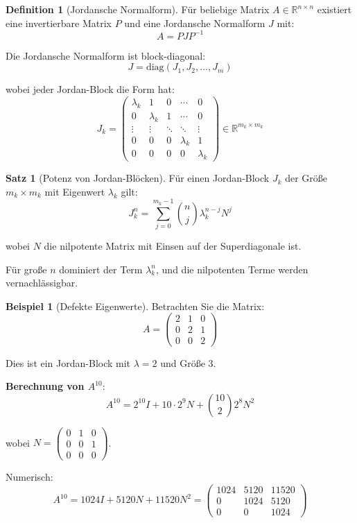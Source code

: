 ﻿\documentclass[a4paper,12pt]{report}
\theoremstyle{definition}
\newtheorem{definition}{Definition}
\newtheorem{beispiel}{Beispiel}
\newtheorem{satz}{Satz}
\begin{document}
	\begin{definition}[Jordansche Normalform]
		Für beliebige Matrix $A \in \mathbb{R}^{n \times n}$ existiert eine invertierbare Matrix $P$ und eine Jordansche Normalform $J$ mit:
		\[
		A = P J P^{-1}
		\]
		
		Die Jordansche Normalform ist block-diagonal:
		\[
		J = \text{diag}(J_1, J_2, \ldots, J_m)
		\]
		
		wobei jeder Jordan-Block die Form hat:
		\[
		J_k = \begin{pmatrix}
			\lambda_k & 1 & 0 & \cdots & 0 \\
			0 & \lambda_k & 1 & \cdots & 0 \\
			\vdots & \vdots & \ddots & \ddots & \vdots \\
			0 & 0 & 0 & \lambda_k & 1 \\
			0 & 0 & 0 & 0 & \lambda_k
		\end{pmatrix} \in \mathbb{R}^{m_k \times m_k}
		\]
	\end{definition}
	
	\begin{satz}[Potenz von Jordan-Blöcken]
		Für einen Jordan-Block $J_k$ der Größe $m_k \times m_k$ mit Eigenwert $\lambda_k$ gilt:
		\[
		J_k^n = \sum_{j=0}^{m_k-1} \binom{n}{j} \lambda_k^{n-j} N^j
		\]
		
		wobei $N$ die nilpotente Matrix mit Einsen auf der Superdiagonale ist.
		
		Für große $n$ dominiert der Term $\lambda_k^n$, und die nilpotenten Terme werden vernachlässigbar.
	\end{satz}
	
	\begin{beispiel}[Defekte Eigenwerte]
		Betrachten Sie die Matrix:
		\[
		A = \begin{pmatrix}
			2 & 1 & 0 \\
			0 & 2 & 1 \\
			0 & 0 & 2
		\end{pmatrix}
		\]
		
		Dies ist ein Jordan-Block mit $\lambda = 2$ und Größe 3.
		
		\textbf{Berechnung von $A^{10}$}:
		\[
		A^{10} = 2^{10} I + 10 \cdot 2^9 N + \binom{10}{2} 2^8 N^2
		\]
		
		wobei $N = \begin{pmatrix} 0 & 1 & 0 \\ 0 & 0 & 1 \\ 0 & 0 & 0 \end{pmatrix}$.
		
		Numerisch:
		\[
		A^{10} = 1024 I + 5120 N + 11520 N^2 = \begin{pmatrix}
			1024 & 5120 & 11520 \\
			0 & 1024 & 5120 \\
			0 & 0 & 1024
		\end{pmatrix}
		\]
	\end{beispiel}
	
\end{document}
